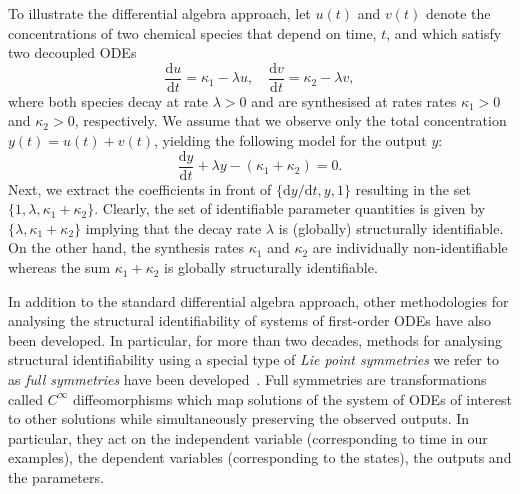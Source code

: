 \documentclass[12pt]{article}
\begin{document}
To illustrate the differential algebra approach, let $u(t)$ and $v(t)$ denote the concentrations of two chemical species that depend on time, $t$, and which satisfy two decoupled ODEs
\begin{equation}
  \dfrac{\mathrm{d}u}{\mathrm{d}t}=\kappa_{1}-\lambda{u},\quad\dfrac{\mathrm{d}v}{\mathrm{d}t}=\kappa_{2}-\lambda{v},
  \label{eq:toy_individual}
\end{equation}
where both species decay at rate $\lambda>0$ and are synthesised at rates rates $\kappa_{1}>0$ and $\kappa_{2}>0$, respectively. We assume that we observe only the total concentration $y(t)=u(t)+v(t)$, yielding the following model for the output $y$:
\begin{equation}
  \dfrac{\mathrm{d}y}{\mathrm{d}t}+\lambda{y}-(\kappa_{1}+\kappa_{2})=0.
  \label{eq:toy_intro}        
\end{equation}
Next, we extract the coefficients in front of $\{\mathrm{d}y/\mathrm{d}t,y,1\}$ resulting in the set $\{1,\lambda,\kappa_{1}+\kappa_{2}\}$. Clearly, the set of identifiable parameter quantities is given by  $\{\lambda,\kappa_{1}+\kappa_{2}\}$ implying that the decay rate $\lambda$ is (globally) structurally identifiable. On the other hand, the synthesis rates $\kappa_{1}$ and $\kappa_{2}$ are individually non-identifiable whereas the sum $\kappa_{1}+\kappa_{2}$ is globally structurally identifiable.

In addition to the standard differential algebra approach, other methodologies for analysing the structural identifiability of systems of first-order ODEs have also been developed. In particular, for more than two decades, methods for analysing structural identifiability using a special type of \emph{Lie point symmetries} we refer to as \emph{full symmetries} have been developed~\cite{yates2009structural,merkt2015higher,massonis2020finding,castro2020structuralIdentifiability,villaverde2022symmetries}. Full symmetries are transformations called $C^{\infty}$ diffeomorphisms which map solutions of the system of ODEs of interest to other solutions while simultaneously preserving the observed outputs. In particular, they act on the independent variable (corresponding to time in our examples), the dependent variables (corresponding to the states), the outputs and the parameters. 
\end{document}

